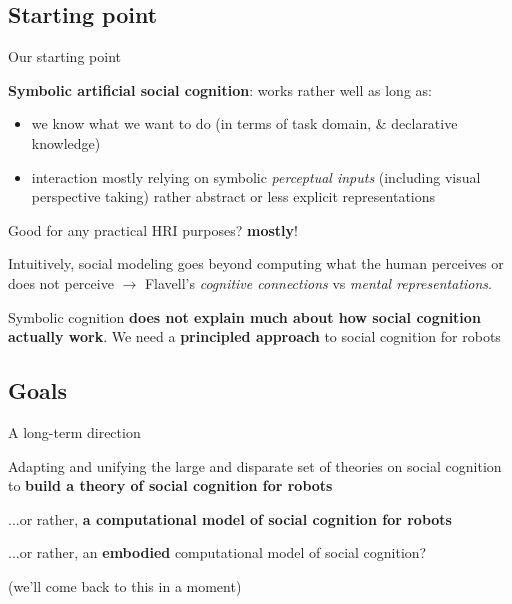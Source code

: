 \documentclass[compress]{beamer}
\begin{document}
\subsection{Starting point}
 \begin{frame}{Our starting point}

        {\bf Symbolic artificial social cognition}:
        works rather well as long as:
        \begin{itemize}
            \item we know what we want to do (in terms of task domain,
                \& declarative knowledge)
            \item interaction mostly relying on symbolic \emph{perceptual inputs}
                (including visual perspective taking) rather abstract or less
                explicit representations
        \end{itemize}
        \pause

        Good for any practical HRI purposes? {\bf mostly}!
        \pause

        Intuitively, social modeling goes beyond computing what the human
        perceives or does not perceive $\rightarrow$ Flavell's \emph{cognitive
        connections} vs \emph{mental representations}.

        Symbolic cognition {\bf does not explain much about how social cognition actually
        work}. We need a {\bf principled approach} to social cognition for robots

 \end{frame}

\subsection{Goals}
\begin{frame}{A long-term direction}

    Adapting and unifying the large and disparate set of theories on social
    cognition to {\bf build a theory of social cognition for
    robots}

    \pause
    ...or rather, {\bf a computational model of social cognition for robots}

    \pause

    ...or rather, an {\bf embodied} computational model of social cognition?

    \footnotesize (we'll come back to this in a moment)

\end{frame}
\end{document}
